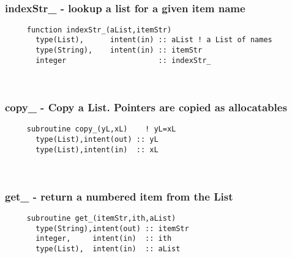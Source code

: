  
\mbox{}\hrulefill\ 
 

  \subsubsection{indexStr\_ - lookup a list for a given item name}

\begin{verbatim} 
     function indexStr_(aList,itemStr)
       type(List),      intent(in) :: aList	! a List of names
       type(String),    intent(in) :: itemStr
       integer                     :: indexStr_
 \end{verbatim} %
 
 
\mbox{}\hrulefill\ 
 
  \subsubsection{copy\_ - Copy a List. Pointers are copied as allocatables}

\begin{verbatim} 
     subroutine copy_(yL,xL)	! yL=xL
       type(List),intent(out) :: yL
       type(List),intent(in)  :: xL
 \end{verbatim} %
 
 
\mbox{}\hrulefill\ 
 

  \subsubsection{get\_ - return a numbered item from the List}

\begin{verbatim} 
     subroutine get_(itemStr,ith,aList)
       type(String),intent(out) :: itemStr
       integer,     intent(in)  :: ith
       type(List),  intent(in)  :: aList
 \end{verbatim} %
 

